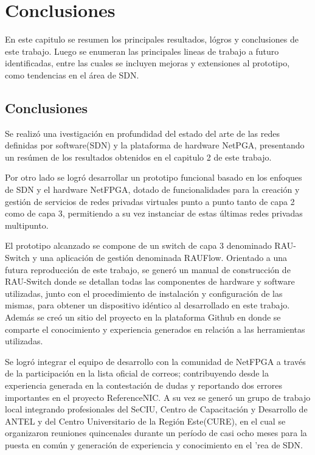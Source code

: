 \chapter{Conclusiones}

\ifpdf
    \graphicspath{{Chapter8/Figs/Raster/}{Chapter8/Figs/PDF/}{Chapter8/Figs/}}
\else
    \graphicspath{{Chapter8/Figs/Vector/}{Chapter8/Figs/}}
\fi

En este capitulo se resumen los principales resultados, l\'ogros y conclusiones de este trabajo. Luego se enumeran las principales lineas de trabajo a futuro identificadas, entre las cuales se incluyen mejoras y extensiones al prototipo, como tendencias en el área de SDN.


\section{Conclusiones}
Se realiz\'o una ivestigaci\'on en profundidad del estado del arte de las redes definidas por software(SDN) y la plataforma de hardware NetPGA, presentando un res\'umen de los resultados obtenidos en el capitulo 2 de este trabajo.

Por otro lado se logr\'o desarrollar un prototipo funcional basado en los enfoques de SDN y el hardware NetFPGA, dotado de funcionalidades para la creaci\'on y gesti\'on de servicios de redes privadas virtuales punto a punto tanto de capa 2 como de capa 3, permitiendo a su vez instanciar de estas \'ultimas redes privadas multipunto. 

El prototipo alcanzado se compone de un switch de capa 3 denominado RAU-Switch y una aplicaci\'on de gesti\'on denominada RAUFlow. Orientado a una futura reproducci\'on de este trabajo, se gener\'o un manual de construcci\'on de RAU-Switch donde se detallan todas las componentes de hardware y software utilizadas, junto con el procedimiento de instalaci\'on y configuraci\'on de las mismas, para obtener un dispositivo id\'entico al desarrollado en este trabajo. Adem\'as se cre\'o un sitio del proyecto en la plataforma Github en donde se comparte el conocimiento y experiencia generados en relaci\'on a las herramientas utilizadas. 

Se logr\'o integrar el equipo de desarrollo con la comunidad de NetFPGA a trav\'es de la participaci\'on en la lista oficial de correos; contribuyendo desde la experiencia generada en la contestaci\'on de dudas y reportando dos errores importantes en el proyecto ReferenceNIC. A su vez se gener\'o un grupo de trabajo local integrando profesionales del SeCIU, Centro de Capacitaci\'on y Desarrollo de ANTEL y del Centro Universitario de la Regi\'on Este(CURE), en el cual se organizaron reuniones quincenales durante un per\'iodo de casi ocho meses para la puesta en com\'un y generaci\'on de experiencia y conocimiento en el \a'rea de SDN.

